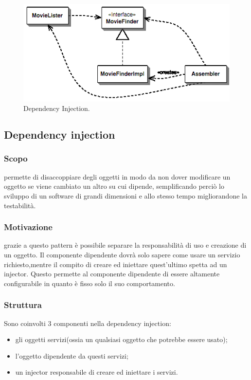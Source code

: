 
\begin{figure} \label{fig:injector}
	\includegraphics[scale=0.5]{img/injector}
	\caption{Dependency Injection.}
\end{figure}

\subsection{Dependency injection}

\subsubsection{Scopo} permette di disaccoppiare degli oggetti in modo da non dover modificare un oggetto se viene cambiato un altro su cui dipende, semplificando perciò lo sviluppo di un software di grandi dimensioni e allo stesso tempo migliorandone la testabilità.

\subsubsection{Motivazione} grazie a questo pattern è possibile separare la responsabilità di uso e creazione di un oggetto. Il componente dipendente dovrà solo sapere come usare un servizio richiesto,mentre il compito di creare ed iniettare quest'ultimo spetta ad un injector. Questo permette al componente dipendente di essere altamente configurabile in quanto è fisso solo il suo comportamento.

\subsubsection{Struttura} Sono coinvolti 3 componenti nella dependency injection:
\begin{itemize}
	\item gli oggetti servizi(ossia un qualsiasi oggetto che potrebbe essere usato);
	\item l'oggetto dipendente da questi servizi;
	\item un injector responsabile di creare ed iniettare i servizi.
\end{itemize}

